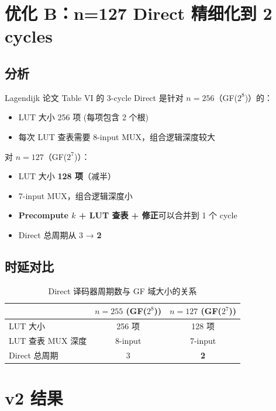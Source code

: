 \documentclass[11pt,a4paper]{article}
\begin{document}
\section{优化 B：n=127 Direct 精细化到 2 cycles}

\subsection{分析}

Lagendijk 论文 Table VI 的 3-cycle Direct 是针对 $n=256$（GF($2^8$)）的：
\begin{itemize}[leftmargin=1.5em, itemsep=1pt]
\item LUT 大小 256 项 (每项包含 2 个根)
\item 每次 LUT 查表需要 8-input MUX，组合逻辑深度较大
\end{itemize}

对 $n=127$（GF($2^7$)）：
\begin{itemize}[leftmargin=1.5em, itemsep=1pt]
\item LUT 大小 \textbf{128 项}（减半）
\item 7-input MUX，组合逻辑深度小
\item \textbf{Precompute $k$ + LUT 查表 + 修正}可以合并到 1 个 cycle
\item Direct 总周期从 3 → \textbf{2}
\end{itemize}

\subsection{时延对比}

\begin{table}[!ht]
\centering
\begin{tabular}{lcc}
\toprule
& \textbf{$n=255$ (GF($2^8$))} & \textbf{$n=127$ (GF($2^7$))} \\
\midrule
LUT 大小             & 256 项 & 128 项 \\
LUT 查表 MUX 深度    & 8-input & 7-input \\
Direct 总周期        & 3       & \textbf{2} \\
\bottomrule
\end{tabular}
\caption{Direct 译码器周期数与 GF 域大小的关系}
\end{table}

\section{v2 结果}
\end{document}
